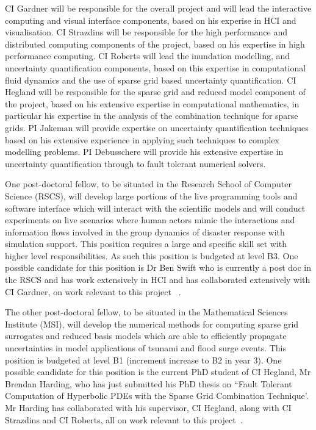\documentclass[a4paper,fontsize=12pt]{scrartcl}
\begin{document}
CI Gardner will be responsible for the overall project and will
lead the interactive computing and visual interface components, based on his experise  in HCI and visualisation.
CI Strazdins will be responsible for the high performance  and 
distributed computing components of the project, based on his expertise in high performance computing.
CI Roberts will lead the inundation modelling, and uncertainty quantification components, based on this expertise in computational fluid dynamics and the use of sparse grid based uncertainty quantification. 
CI Hegland will be responsible for the sparse grid and reduced model component of the project, based on his extensive expertise in computational mathematics, in particular his expertise in the analysis of the combination technique for sparse grids.  PI Jakeman will provide expertise on uncertainty quantification techniques based on his extensive experience in applying such techniques to complex modelling problems. 
PI Debusschere will provide his extensive expertise in uncertainty quantification through to fault tolerant numerical solvers. 

One post-doctoral fellow, to be situated in the
Research School of Computer Science (RSCS), will develop large
portions of the live programming tools and software interface which
will interact with the scientific models and will conduct experiments
on live scenarios where human actors mimic the interactions and
information flows involved in the group dynamics of disaster response
with simulation support. This position requires a large and specific 
skill set with higher level responsibilities. As such this 
position is budgeted at level B3. One possible candidate for this position is 
Dr Ben Swift who is currently a post doc in the RSCS and has work 
extensively in HCI and has collaborated extensively with CI Gardner, on work 
relevant to this project ~\parencite{martin2016intelligent,martin2015tracking,swift2014coding,swift2013visual,swift_live_2016}.

The other post-doctoral fellow, to be
situated in the Mathematical Sciences Institute (MSI), will develop
the numerical methods for computing sparse grid surrogates and reduced
basis models which are able to efficiently propagate uncertainties in
model applications of tsunami and flood surge events. This 
position is budgeted at level B1 (increment increase to B2 in year 3). 
One possible candidate for this position is the current PhD student of CI Hegland, Mr Brendan Harding, 
who has just submitted his PhD thesis on ``Fault Tolerant Computation of
Hyperbolic PDEs with the Sparse Grid Combination Technique'. Mr Harding has 
collaborated with his supervisor, CI Hegland, along with CI Strazdins and CI Roberts, all
on work relevant to this project~\parencite{deBaarHarding2015,AliEtal2015,StrazdinsEtal2015,HardingHLS2015,Ali11022016}.
\end{document}
